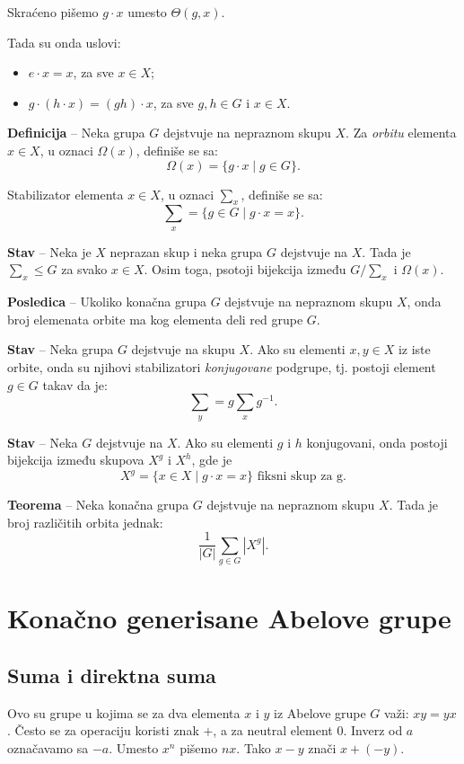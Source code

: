 \documentclass[a4paper,12pt]{article}
\newcommand{\f}[1]{\(#1\)}
\begin{document}
Skraćeno pišemo \f{g \cdot x} umesto \f{\Theta(g, x)}.

Tada su onda uslovi:
\begin{itemize}
  \item \f{e \cdot x = x}, za sve \f{x \in X};
  \item \f{g \cdot (h \cdot x) = (gh) \cdot x}, za sve \f{g, h \in G} i \f{x \in X}.
\end{itemize}

\textbf{Definicija} -- Neka grupa \f{G} dejstvuje na nepraznom skupu \f{X}. Za \emph{orbitu} elementa 
\f{x \in X}, u oznaci \f{\Omega(x)}, definiše se sa:
\[
  \Omega(x) = \{ g \cdot x \mid g \in G \}.
\]

Stabilizator elementa \f{x \in X}, u oznaci \f{\sum_x}, definiše se sa:
\[
  \sum_x = \{ g \in G \mid g \cdot x = x \}.
\]

\textbf{Stav} -- Neka je \f{X} neprazan skup i neka grupa \f{G} dejstvuje na \f{X}. Tada je \f{\sum_x \leq G} za svako \f{x \in X}.
Osim toga, psotoji bijekcija između \f{G/\sum_x} i \f{\Omega(x)}.

\textbf{Posledica} -- Ukoliko konačna grupa \f{G} dejstvuje na nepraznom skupu \f{X}, onda broj elemenata
orbite ma kog elementa deli red grupe \f{G}.

\textbf{Stav} -- Neka grupa \f{G} dejstvuje na skupu \f{X}. Ako su elementi \f{x, y \in X} iz iste orbite, onda su njihovi stabilizatori
\emph{konjugovane} podgrupe, tj. postoji element \f{g \in G} takav da je:
\[
  \sum_y = g \sum_x g^{-1}.
\]

\textbf{Stav} -- Neka \f{G} dejstvuje na \f{X}. Ako su elementi \f{g} i \f{h} konjugovani, onda 
postoji bijekcija između skupova \f{X^g} i \f{X^h}, gde je
\[
  X^g = \{ x \in X \mid g \cdot x = x \} \text{ fiksni skup za g.}
\] 

\textbf{Teorema} -- Neka konačna grupa \f{G} dejstvuje na nepraznom skupu \f{X}. Tada je broj
različitih orbita jednak:
\[
  \frac{1}{|G|} \sum_{g \in G} |X^g|.
\]


\section{Konačno generisane Abelove grupe}

\subsection{Suma i direktna suma}

Ovo su grupe u kojima se za dva elementa \f{x} i \f{y} iz Abelove grupe \f{G} važi: \f{xy = yx}.
Često se za operaciju koristi znak \f{+}, a za neutral element \f{0}. Inverz od \f{a} označavamo sa \f{-a}.
Umesto \f{x^n} pišemo \f{nx}. Tako \f{x-y} znači \f{x + (-y)}.
\end{document}
